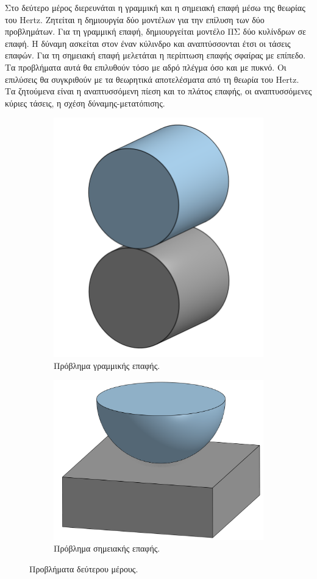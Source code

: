 \documentclass{article}
\begin{document}
\par Στο δεύτερο μέρος διερευνάται η γραμμική και η σημειακή επαφή μέσω της θεωρίας του Hertz. Ζητείται η δημιουργία δύο μοντέλων για την επίλυση των δύο προβλημάτων. Για τη γραμμική επαφή, δημιουργείται μοντέλο ΠΣ δύο κυλίνδρων σε επαφή. Η δύναμη ασκείται στον έναν κύλινδρο και αναπτύσσονται έτσι οι τάσεις επαφών. Για τη σημειακή επαφή μελετάται η περίπτωση επαφής σφαίρας με επίπεδο. Τα προβλήματα αυτά θα επιλυθούν τόσο με αδρό πλέγμα όσο και με πυκνό. Οι επιλύσεις θα συγκριθούν με τα θεωρητικά αποτελέσματα από τη θεωρία του Hertz. Τα ζητούμενα είναι η αναπτυσσόμενη πίεση και το πλάτος επαφής, οι αναπτυσσόμενες κύριες τάσεις, η σχέση δύναμης-μετατόπισης.
\begin{figure}[H]
    \centering
    \begin{subfigure}{0.49\linewidth}
        \centering
        \includegraphics[width=0.6\linewidth]{media/kyl.png}
        \caption{Πρόβλημα γραμμικής επαφής.}
    \end{subfigure}
    \hfill
    \begin{subfigure}{0.49\linewidth}
        \centering
        \includegraphics[width=0.6\linewidth]{media/sfaira.png}
        \caption{Πρόβλημα σημειακής επαφής.}
    \end{subfigure}
    \caption{Προβλήματα δεύτερου μέρους.}
    \label{fig:merosB}
\end{figure}
\end{document}
